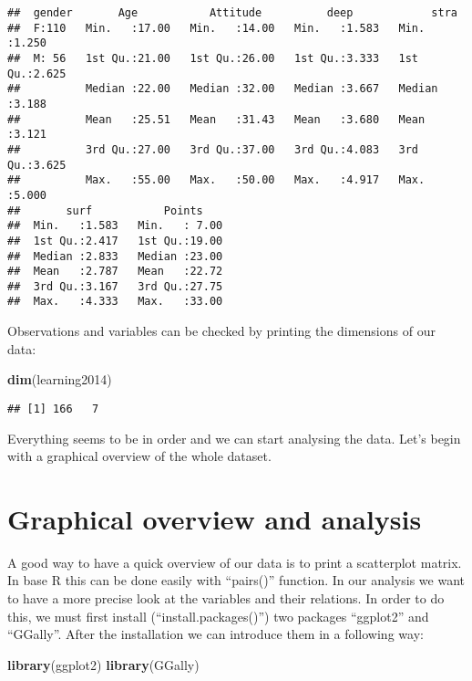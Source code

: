 \documentclass[]{article}
\newenvironment{Shaded}{\begin{snugshade}}{\end{snugshade}}
\newcommand{\KeywordTok}[1]{\textcolor[rgb]{0.13,0.29,0.53}{\textbf{#1}}}
\newcommand{\NormalTok}[1]{#1}
\begin{document}
\begin{verbatim}
##  gender       Age           Attitude          deep            stra      
##  F:110   Min.   :17.00   Min.   :14.00   Min.   :1.583   Min.   :1.250  
##  M: 56   1st Qu.:21.00   1st Qu.:26.00   1st Qu.:3.333   1st Qu.:2.625  
##          Median :22.00   Median :32.00   Median :3.667   Median :3.188  
##          Mean   :25.51   Mean   :31.43   Mean   :3.680   Mean   :3.121  
##          3rd Qu.:27.00   3rd Qu.:37.00   3rd Qu.:4.083   3rd Qu.:3.625  
##          Max.   :55.00   Max.   :50.00   Max.   :4.917   Max.   :5.000  
##       surf           Points     
##  Min.   :1.583   Min.   : 7.00  
##  1st Qu.:2.417   1st Qu.:19.00  
##  Median :2.833   Median :23.00  
##  Mean   :2.787   Mean   :22.72  
##  3rd Qu.:3.167   3rd Qu.:27.75  
##  Max.   :4.333   Max.   :33.00
\end{verbatim}

Observations and variables can be checked by printing the dimensions of
our data:

\begin{Shaded}
\begin{Highlighting}[]
\KeywordTok{dim}\NormalTok{(learning2014)}
\end{Highlighting}
\end{Shaded}

\begin{verbatim}
## [1] 166   7
\end{verbatim}

Everything seems to be in order and we can start analysing the data.
Let's begin with a graphical overview of the whole dataset.

\section{Graphical overview and
analysis}\label{graphical-overview-and-analysis}

A good way to have a quick overview of our data is to print a
scatterplot matrix. In base R this can be done easily with ``pairs()''
function. In our analysis we want to have a more precise look at the
variables and their relations. In order to do this, we must first
install (``install.packages()'') two packages ``ggplot2'' and
``GGally''. After the installation we can introduce them in a following
way:

\begin{Shaded}
\begin{Highlighting}[]
\KeywordTok{library}\NormalTok{(ggplot2)}
\KeywordTok{library}\NormalTok{(GGally)}
\end{Highlighting}
\end{Shaded}
\end{document}
